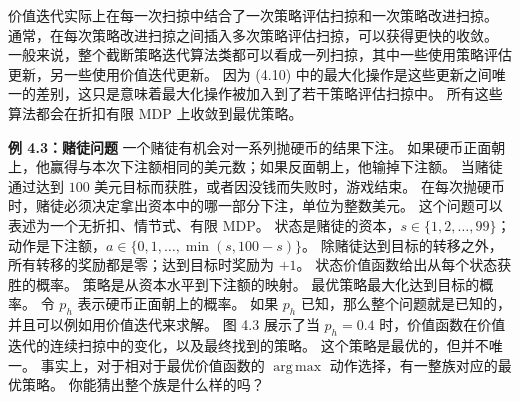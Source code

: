 \documentclass[UTF8,12pt,a4paper,fontset=fandol]{ctexart}
\begin{document}
\begin{center}
\end{center}

价值迭代实际上在每一次扫掠中结合了一次策略评估扫掠和一次策略改进扫掠。
通常，在每次策略改进扫掠之间插入多次策略评估扫掠，可以获得更快的收敛。
一般来说，整个截断策略迭代算法类都可以看成一列扫掠，其中一些使用策略评估更新，另一些使用价值迭代更新。
因为 (4.10) 中的最大化操作是这些更新之间唯一的差别，这只是意味着最大化操作被加入到了若干策略评估扫掠中。
所有这些算法都会在折扣有限 MDP 上收敛到最优策略。

\noindent\textbf{例 4.3：赌徒问题}
一个赌徒有机会对一系列抛硬币的结果下注。
如果硬币正面朝上，他赢得与本次下注额相同的美元数；如果反面朝上，他输掉下注额。
当赌徒通过达到 $100$ 美元目标而获胜，或者因没钱而失败时，游戏结束。
在每次抛硬币时，赌徒必须决定拿出资本中的哪一部分下注，单位为整数美元。
这个问题可以表述为一个无折扣、情节式、有限 MDP。
状态是赌徒的资本，$s\in\{1,2,\ldots,99\}$；动作是下注额，$a\in\{0,1,\ldots,\min(s,100-s)\}$。
除赌徒达到目标的转移之外，所有转移的奖励都是零；达到目标时奖励为 $+1$。
状态价值函数给出从每个状态获胜的概率。
策略是从资本水平到下注额的映射。
最优策略最大化达到目标的概率。
令 $p_h$ 表示硬币正面朝上的概率。
如果 $p_h$ 已知，那么整个问题就是已知的，并且可以例如用价值迭代来求解。
图 4.3 展示了当 $p_h=0.4$ 时，价值函数在价值迭代的连续扫掠中的变化，以及最终找到的策略。
这个策略是最优的，但并不唯一。
事实上，对于相对于最优价值函数的 $\operatorname*{arg\,max}$ 动作选择，有一整族对应的最优策略。
你能猜出整个族是什么样的吗？
\end{document}
